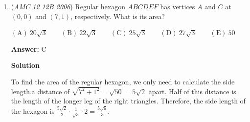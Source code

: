 \begin{enumerate}
\textbf{Solution 2}

$ADPO$ and $OPBC$ are congruent right trapezoids with legs $2$ and $4$ and with $OP$ equal to $6$. Draw an altitude from $O$ to either $DP$ or $CP$, creating a rectangle with width $2$ and base $x$, and a right triangle with one leg $2$, the hypotenuse $6$, and the other $x$. Usingthe \href{https://artofproblemsolving.com/wiki/index.php?title=Pythagorean\_theorem}{Pythagorean theorem}, $x$ is equal to $4\sqrt{2}$, and $x$ is also equal to the height of the trapezoid. The area of the trapezoid is thus $\frac{1}{2}\cdot(4+2)\cdot4\sqrt{2} = 12\sqrt{2}$, and the total area is two trapezoids, or $\boxed{24\sqrt{2}}$.

 



\textbf{Solution 3}

We can create two congruent rectangles and two congruent right triangles in the figure. We see that each rectangle will have a side length of $2$, and each triangle will therefore also have a base of $2$.

 The hypotenuse of each right triangle has a length of $6$, so we use the Pythagorean theorem and find the length of the height of each triangle as follows: 
 \[\sqrt{6^2 - 2^2} = \sqrt{36 - 4} = 4\sqrt{2}\]

 The area of each individual triangle is $\frac{2 \cdot 4\sqrt{2}}{2} = 4\sqrt{2}$. We multiply this by two to get the area of both triangles combined, which gives $8\sqrt{2}$.

 Now to find the area of each rectangle, we simply multiply $2$ by $4\sqrt{2}$ and double this, which gives the combined area of the two rectangles to be $16\sqrt{2}$. We add $8\sqrt{2}$ to this to give our answer of $\boxed{\textbf{(B) } 24\sqrt{2}}$.

 


	\item (\textit{AMC 12 12B 2006}) Regular hexagon $ABCDEF$ has vertices $A$ and $C$ at $(0,0)$ and $(7,1)$, respectively. What is its area?


 $\mathrm{(A)}\ 20\sqrt {3} \qquad \mathrm{(B)}\ 22\sqrt {3} \qquad \mathrm{(C)}\ 25\sqrt {3} \qquad \mathrm{(D)}\ 27\sqrt {3} \qquad \mathrm{(E)}\ 50$

 \textbf{Answer: }C



\textbf{Solution}

To find the area of the regular hexagon, we only need to calculate the side length.a distance of $\sqrt{7^2+1^2} = \sqrt{50} = 5\sqrt{2}$ apart.  Half of this distance is the length of the longer leg of the right triangles.  Therefore, the side length of the hexagon is $\frac{5\sqrt{2}}{2}\cdot\frac{1}{\sqrt{3}}\cdot2 = \frac{5\sqrt{6}}{3}$.


\end{enumerate}
